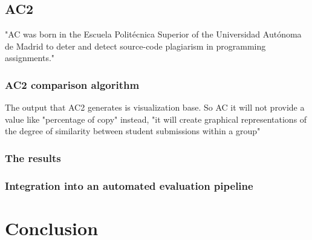 \documentclass[a4paper, 11pt]{article}
\renewcommand{\\}{\vspace*{0.5\baselineskip} \newline}
\begin{document}
\subsection{AC2}

"AC was born in the Escuela Politécnica Superior of the Universidad Autónoma de Madrid to deter and detect source-code plagiarism in programming assignments." \autocite{AC2}


\subsubsection{AC2 comparison algorithm}

The output that AC2 generates is visualization base. So AC it will not provide a value like "percentage of copy" instead, "it will create graphical representations of the degree of similarity between student submissions within a group" \autocite{AC2}   


\subsubsection{The results}

\subsubsection{Integration into an automated evaluation pipeline}



\section{Conclusion}

\newpage

\printbibliography[
	heading=bibintoc,
	title={References}
]

\appendix
\end{document}
